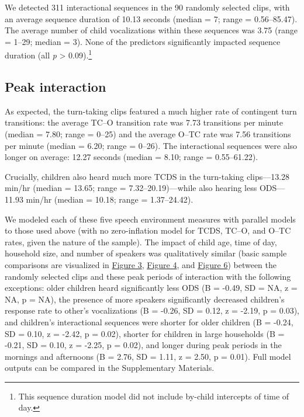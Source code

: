 \documentclass[floatsintext,man]{apa6}
\theoremstyle{definition}
\theoremstyle{definition}
\theoremstyle{definition}
\theoremstyle{remark}
\begin{document}
We detected 311 interactional sequences in the 90 randomly selected
clips, with an average sequence duration of 10.13 seconds (median = 7;
range = 0.56--85.47). The average number of child vocalizations within
these sequences was 3.75 (range = 1--29; median = 3). None of the
predictors significantly impacted sequence duration (all \emph{p}
\textgreater{} 0.09).\footnote{This sequence duration model did not
  include by-child intercepts of time of day.}

\subsection{Peak interaction}\label{peak-interaction}

As expected, the turn-taking clips featured a much higher rate of
contingent turn transitions: the average TC--O transition rate was 7.73
transitions per minute (median = 7.80; range = 0--25) and the average
O--TC rate was 7.56 transitions per minute (median = 6.20; range =
0--26). The interactional sequences were also longer on average: 12.27
seconds (median = 8.10; range = 0.55--61.22).

Crucially, children also heard much more TCDS in the turn-taking
clips---13.28 min/hr (median = 13.65; range = 7.32--20.19)---while also
hearing less ODS---11.93 min/hr (median = 10.18; range = 1.37--24.42).

We modeled each of these five speech environment measures with parallel
models to those used above (with no zero-inflation model for TCDS,
TC--O, and O--TC rates, given the nature of the sample). The impact of
child age, time of day, household size, and number of speakers was
qualitatively similar (basic sample comparisons are visualized in
\protect\hyperlink{fig3}{Figure 3}, \protect\hyperlink{fig4}{Figure 4},
and \protect\hyperlink{fig6}{Figure 6}) between the randomly selected
clips and these peak periods of interaction with the following
exceptions: older children heard significantly less ODS (B = -0.49, SD =
NA, z = NA, p = NA), the presence of more speakers significantly
decreased children's response rate to other's vocalizations (B = -0.26,
SD = 0.12, z = -2.19, p = 0.03), and children's interactional sequences
were shorter for older children (B = -0.24, SD = 0.10, z = -2.42, p =
0.02), shorter for children in large households (B = -0.21, SD = 0.10, z
= -2.25, p = 0.02), and longer during peak periods in the mornings and
afternoons (B = 2.76, SD = 1.11, z = 2.50, p = 0.01). Full model outputs
can be compared in the Supplementary Materials.
\end{document}
